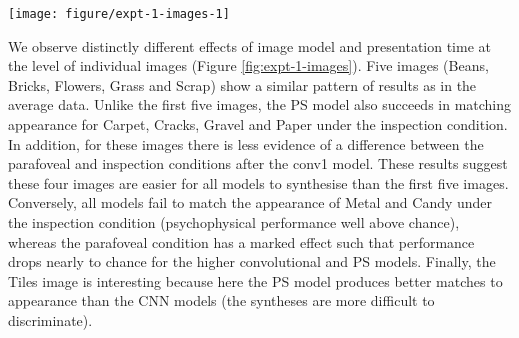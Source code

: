 \documentclass[doc, 11pt,a4paper,natbib]{apa6}\usepackage[]{graphicx}\usepackage[]{color}
\makeatletter
\def\maxwidth{ %
  \ifdim\Gin@nat@width>\linewidth
    \linewidth
  \else
    \Gin@nat@width
  \fi
}
\newenvironment{knitrout}{}{} %
\makeatother
\begin{document}


\begin{knitrout}
\color{fgcolor}\begin{figure*}
\texttt{[image: figure/expt-1-images-1]} \caption{Performance for each image in Experiment 1. 
              Points show the grand mean of all observer means (based on 25 trials for authors and 5 trials for naives). 
              Error bars on points show $\pm 1$ SEM. 
              Lines show mixed-effects model estimates (posterior mean, including random effects of image but excluding random effects of subject) and shaded regions show 95\% credible intervals.
              That is, the model predicts mean performance to lie in the shaded area with 95\% probability, if the image was shown to an average, unknown subject.
              Images have been arranged according to consistent patterns of results (reading left-to-right).
              The original images can be seen in Figure \ref{fig:original_stimuli}.}\label{fig:expt-1-images}
\end{figure*}


\end{knitrout}

We observe distinctly different effects of image model and presentation time at the level of individual images (Figure \ref{fig:expt-1-images}).
Five images (Beans, Bricks, Flowers, Grass and Scrap) show a similar pattern of results as in the average data.
Unlike the first five images, the PS model also succeeds in matching appearance for Carpet, Cracks, Gravel and Paper under the inspection condition. 
In addition, for these images there is less evidence of a difference between the parafoveal and inspection conditions after the conv1 model. 
These results suggest these four images are easier for all models to synthesise than the first five images.
Conversely, all models fail to match the appearance of Metal and Candy under the inspection condition (psychophysical performance well above chance), whereas the parafoveal condition has a marked effect such that performance drops nearly to chance for the higher convolutional and PS models.
Finally, the Tiles image is interesting because here the PS model produces better matches to appearance than the CNN models (the syntheses are more difficult to discriminate).
\end{document}
